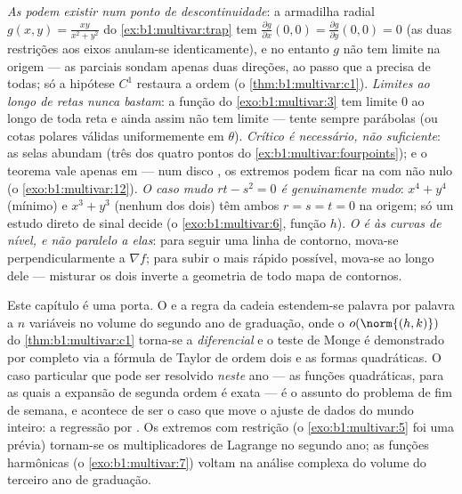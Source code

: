 \begin{remark}
\label{rem:b1:multivar:pitfalls}
\emph{As  podem existir num ponto de
descontinuidade}: a armadilha radial $g(x,y) = \frac{xy}{x^2+y^2}$ do \cref{ex:b1:multivar:trap} tem $\frac{\partial g}{\partial
x}(0,0) = \frac{\partial g}{\partial y}(0,0) = 0$ (as duas
restrições aos eixos anulam-se identicamente), e no entanto $g$ não
tem limite na origem --- as parciais sondam apenas duas direções, ao
passo que a  precisa de todas; só a hipótese $C^1$
restaura a ordem (o \cref{thm:b1:multivar:c1}).
\emph{Limites ao longo de retas nunca bastam}: a função do \cref{exo:b1:multivar:3} tem
limite $0$ ao longo de toda reta e ainda assim não tem limite ---
tente sempre parábolas (ou cotas polares válidas uniformemente em
$\theta$).
\emph{Crítico é necessário, não suficiente}: as selas abundam (três
dos quatro pontos do \cref{ex:b1:multivar:fourpoints}); e o teorema vale apenas em 
\emph{} --- num disco , os extremos podem ficar na
 com  não nulo (o \cref{exo:b1:multivar:12}).
\emph{O caso mudo $rt - s^2 = 0$ é genuinamente mudo}: $x^4
+ y^4$ (mínimo) e $x^3 + y^3$
(nenhum dos dois) têm ambos $r = s = t
= 0$ na origem; só um estudo direto de
sinal decide (o \cref{exo:b1:multivar:6}, função $h$).
\emph{O  é  às curvas de nível, e não paralelo a
elas}: para seguir uma linha de contorno, mova-se perpendicularmente a
$\nabla
f$; para subir o mais rápido possível, mova-se ao longo dele ---
misturar os dois inverte a geometria de todo mapa de contornos.
\end{remark}

\begin{remark}
\label{rem:b1:multivar:whereused}
Este capítulo é uma porta. O  e a regra da cadeia
estendem-se palavra por palavra a $n$ variáveis no volume do segundo
ano de graduação, onde o $o(\norm{(h,k)})$ do \cref{thm:b1:multivar:c1} torna-se a \emph{diferencial}
e o teste de Monge é demonstrado por completo via a fórmula de Taylor
de ordem dois e as formas quadráticas. O caso particular que pode ser
resolvido \emph{neste} ano --- as funções quadráticas, para as quais
a expansão de segunda ordem é exata --- é o assunto do problema de fim
de semana, e acontece de ser o caso que move o ajuste de dados do
mundo inteiro: a regressão por . Os extremos com
restrição (o \cref{exo:b1:multivar:5} foi uma prévia) tornam-se os multiplicadores de
Lagrange no segundo ano; as funções harmônicas (o \cref{exo:b1:multivar:7}) voltam na
análise complexa do volume do terceiro ano de graduação.
\end{remark}

